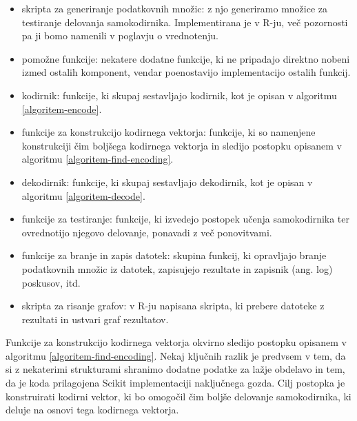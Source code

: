\documentclass[12pt,a4paper,twoside]{article}
\theoremstyle{definition} %
\theoremstyle{plain} %
\numberwithin{equation}{section}  %
\begin{document}
\begin{itemize}
	\item skripta za generiranje podatkovnih množic: z njo generiramo množice za testiranje delovanja samokodirnika. 
	Implementirana je v R-ju, več pozornosti pa ji bomo namenili v poglavju o vrednotenju. %
	
	\item pomožne funkcije: nekatere dodatne funkcije, ki ne pripadajo direktno nobeni izmed ostalih komponent, 
	vendar poenostavijo implementacijo ostalih funkcij.

	\item kodirnik: funkcije, ki skupaj sestavljajo kodirnik, kot je opisan v algoritmu \ref{algoritem-encode}.

	\item funkcije za konstrukcijo kodirnega vektorja: 
	funkcije, ki so namenjene konstrukciji čim boljšega kodirnega vektorja in sledijo postopku opisanem v algoritmu \ref{algoritem-find-encoding}.

	\item dekodirnik: funkcije, ki skupaj sestavljajo dekodirnik, kot je opisan v algoritmu \ref{algoritem-decode}.

	\item funkcije za testiranje: funkcije, ki izvedejo postopek učenja samokodirnika ter ovrednotijo njegovo delovanje, ponavadi z več ponovitvami.

	\item funkcije za branje in zapis datotek: skupina funkcij, ki opravljajo branje podatkovnih množic iz datotek, zapisujejo rezultate in zapisnik (ang. log) poskusov, itd.

	\item skripta za risanje grafov: v R-ju napisana skripta, ki prebere datoteke z rezultati in ustvari graf rezultatov.
\end{itemize}



Funkcije za konstrukcijo kodirnega vektorja okvirno sledijo postopku opisanem v algoritmu \ref{algoritem-find-encoding}.
Nekaj ključnih razlik je predvsem v tem, da si z nekaterimi strukturami shranimo dodatne podatke za lažje obdelavo in tem, da je koda prilagojena Scikit implementaciji naključnega gozda.
Cilj postopka je konstruirati kodirni vektor, ki bo omogočil čim boljše delovanje samokodirnika, ki deluje na osnovi tega kodirnega vektorja. %
\end{document}
